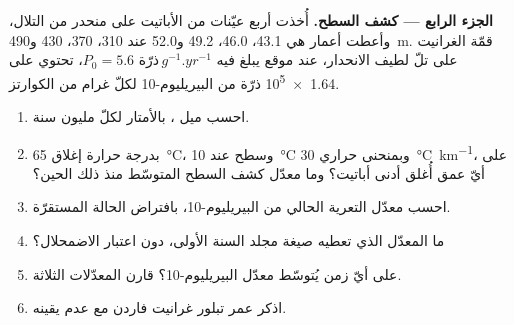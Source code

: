 \begin{problem}
\medskip\noindent\textbf{الجزء الرابع --- كشف السطح.} أُخذت أربع عيّنات من الأباتيت
على منحدر من التلال، وأعطت أعمار  هي 43.1، 46.0، 49.2
و\qty{52.0}{\Ma} عند 310، 370، 430 و\qty{490}{m}. قمّة الغرانيت
على تلّ لطيف الانحدار، عند موقع يبلغ فيه $P_0 = \num{5.6}\text{ ذرّة}\,\unit{g^{-1}.yr^{-1}}$،
تحتوي على \num{1.64e5} ذرّة من البيريليوم-10 لكلّ غرام من الكوارتز.
\begin{enumerate}[resume]
\item احسب ميل ، بالأمتار لكلّ
مليون سنة.
\item بدرجة حرارة إغلاق \qty{65}{\celsius}، وسطح عند
\qty{10}{\celsius} وبمنحنى حراري \qty{30}{\celsius.km^{-1}}، على أيّ عمق
أُغلق أدنى أباتيت؟ وما معدّل كشف السطح المتوسّط منذ ذلك الحين؟
\item احسب معدّل التعرية الحالي من البيريليوم-10، بافتراض الحالة
المستقرّة.
\item ما المعدّل الذي تعطيه صيغة مجلد السنة الأولى، دون اعتبار الاضمحلال؟
\item على أيّ زمن يُتوسّط معدّل البيريليوم-10؟ قارن
المعدّلات الثلاثة.
\item اذكر عمر تبلور غرانيت فاردن مع
عدم يقينه.
\end{enumerate}
\end{problem}
